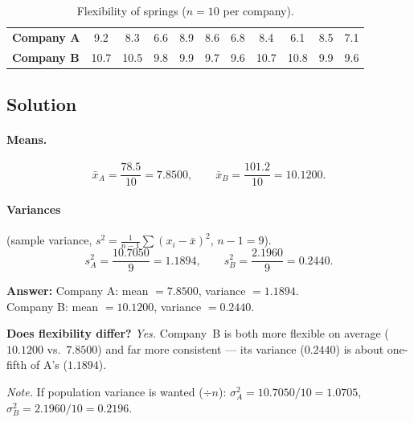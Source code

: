 \documentclass[11pt]{article}
\begin{document}
\begin{table}[H]
\centering
\renewcommand{\arraystretch}{1.25}
\begin{tabular}{l *{10}{c}}
\toprule
\textbf{Company A} & 9.2 & 8.3 & 6.6 & 8.9 & 8.6 & 6.8 & 8.4 & 6.1 & 8.5 & 7.1 \\
\textbf{Company B} & 10.7 & 10.5 & 9.8 & 9.9 & 9.7 & 9.6 & 10.7 & 10.8 & 9.9 & 9.6 \\
\bottomrule
\end{tabular}
\caption{Flexibility of springs ($n=10$ per company).}
\end{table}

\subsection*{Solution}

\paragraph{Means.}
\[
\bar{x}_A=\frac{78.5}{10}=7.8500,\qquad \bar{x}_B=\frac{101.2}{10}=10.1200 .
\]

\paragraph{Variances} (sample variance, $s^2=\tfrac{1}{n-1}\sum (x_i-\bar{x})^2$, $n-1=9$).
\[
s_A^2=\frac{10.7050}{9}=1.1894,\qquad s_B^2=\frac{2.1960}{9}=0.2440 .
\]

\begin{answerbox}
\textbf{Answer:}\quad
Company A: mean $=7.8500$, variance $=1.1894$.\\
Company B: mean $=10.1200$, variance $=0.2440$.
\end{answerbox}

\noindent
\textbf{Does flexibility differ?} \emph{Yes.} Company~B is both more flexible on
average ($10.1200$ vs.\ $7.8500$) and far more consistent --- its variance
($0.2440$) is about one-fifth of A's ($1.1894$).

\medskip
\noindent\footnotesize\emph{Note.} If population variance is wanted ($\div n$):
$\sigma_A^2 = 10.7050/10 = 1.0705$, $\sigma_B^2 = 2.1960/10 = 0.2196$.
\end{document}
